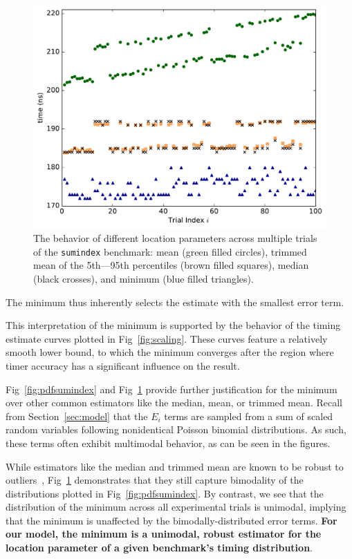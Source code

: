 \documentclass[conference]{IEEEtran}
\begin{document}
\begin{figure}
\centering
\includegraphics[width=\columnwidth]{figures/fig3/location_estimators_sumindex}
\caption{The behavior of different location parameters across multiple trials of
the \lstinline|sumindex| benchmark: mean (green filled circles), trimmed mean of
the 5th---95th percentiles (brown filled squares), median (black crosses), and
minimum (blue filled triangles).}
\label{fig:locationmeasures}
\end{figure}

The minimum thus inherently selects the estimate with the smallest error term.

This interpretation of the minimum is supported by the behavior of the timing estimate
curves plotted in Fig~\ref{fig:scaling}. These curves feature a relatively smooth lower
bound, to which the minimum converges after the region where timer accuracy has a
significant influence on the result.

Fig~\ref{fig:pdfsumindex} and Fig~\ref{fig:locationmeasures} provide further justification
for the minimum over other common estimators like the median, mean, or trimmed mean. Recall
from Section~\ref{sec:model} that the $E_i$ terms are sampled from a sum of scaled random
variables following nonidentical Poisson binomial distributions. As such, these terms often
exhibit multimodal behavior, as can be seen in the figures.

While estimators like the median and trimmed mean are known to be robust to
outliers~\cite{Maronna2006}, Fig~\ref{fig:locationmeasures} demonstrates that they still
capture bimodality of the distributions plotted in Fig~\ref{fig:pdfsumindex}. By contrast,
we see that the distribution of the minimum across all experimental trials is unimodal,
implying that the minimum is unaffected by the bimodally-distributed error terms.
\textbf{For our model, the minimum is a unimodal, robust estimator for the location
parameter of a given benchmark's timing distribution}.
\end{document}
